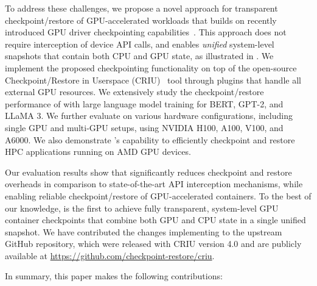 To address these challenges, we propose a novel approach for transparent checkpoint/restore of GPU-accelerated workloads that builds on recently introduced GPU driver checkpointing capabilities~\cite{gurfinkel2024checkpointing, bhardwaj2021fast}. This approach does not require interception of device API calls, and enables \textit{unified} system-level snapshots that contain both CPU and GPU state, as illustrated in . We implement the proposed checkpointing functionality on top of the open-source Checkpoint/Restore in Userspace (CRIU)~\cite{criu} tool through plugins that handle all external GPU resources. We extensively study the checkpoint/restore performance of \sys with large language model training for BERT, GPT-2, and LLaMA 3. We further evaluate \sys on various hardware configurations, including single GPU and multi-GPU setups, using NVIDIA H100, A100, V100, and A6000. We also demonstrate \sys's capability to efficiently checkpoint and restore HPC applications running on AMD GPU devices. 

Our evaluation results show that \sys significantly reduces checkpoint and restore overheads in comparison to state-of-the-art API interception mechanisms, while enabling reliable checkpoint/restore of GPU-accelerated containers.
To the best of our knowledge, \sys is the first to achieve fully transparent, system-level GPU container checkpoints that combine both GPU and CPU state in a single unified snapshot. We have contributed the changes implementing \sys to the upstream GitHub repository, which were released with CRIU version 4.0 and are publicly available at \url{https://github.com/checkpoint-restore/criu}.

In summary, this paper makes the following contributions:

